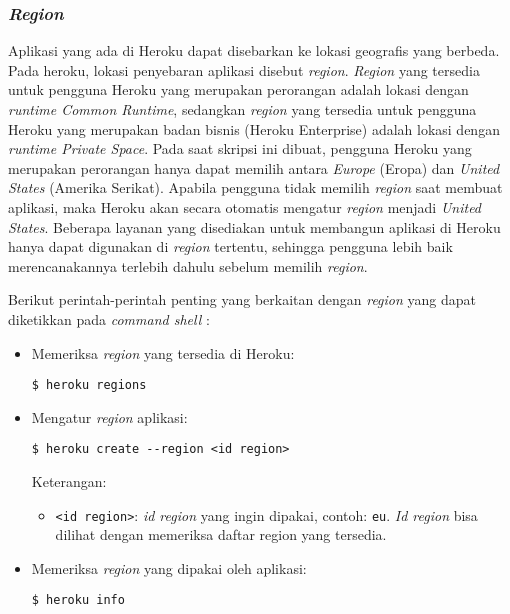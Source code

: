 \subsubsection{\textit{Region}}
Aplikasi yang ada di Heroku dapat disebarkan ke lokasi geografis yang berbeda. Pada heroku, lokasi penyebaran aplikasi disebut \textit{region}. \textit{Region} yang tersedia untuk pengguna Heroku yang merupakan perorangan adalah lokasi dengan \textit{runtime Common Runtime}, sedangkan \textit{region} yang tersedia untuk pengguna Heroku yang merupakan badan bisnis (Heroku Enterprise) adalah lokasi dengan \textit{runtime Private Space}. Pada saat skripsi ini dibuat, pengguna Heroku yang merupakan perorangan hanya dapat memilih antara \textit{Europe} (Eropa) dan \textit{United States} (Amerika Serikat). Apabila pengguna tidak memilih \textit{region} saat membuat aplikasi, maka Heroku akan secara otomatis mengatur \textit{region} menjadi \textit{United States}. Beberapa layanan yang disediakan untuk membangun aplikasi di Heroku hanya dapat digunakan di \textit{region} tertentu, sehingga pengguna lebih baik merencanakannya terlebih dahulu sebelum memilih \textit{region}.

Berikut perintah-perintah penting yang berkaitan dengan \textit{region} yang dapat diketikkan pada \textit{command shell} :
\begin{itemize}
\item Memeriksa \textit{region} yang tersedia di Heroku:
\begin{lstlisting}
$ heroku regions
\end{lstlisting}
\item Mengatur \textit{region} aplikasi:
\begin{lstlisting}
$ heroku create --region <id region>
\end{lstlisting}
Keterangan:
\begin{itemize}
\item \texttt{<id region>}: \textit{id region} yang ingin dipakai, contoh: \texttt{eu}. \textit{Id region} bisa dilihat dengan memeriksa daftar region yang tersedia.
\end{itemize}
\item Memeriksa \textit{region} yang dipakai oleh aplikasi:
\begin{lstlisting}
$ heroku info
\end{lstlisting}
\end{itemize}

